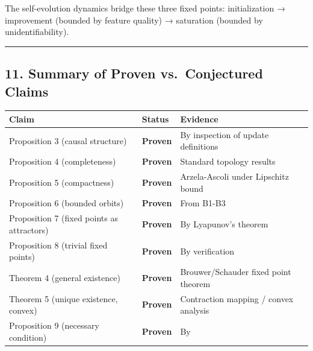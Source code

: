 \documentclass[
  12pt,
]{article}
\begin{document}
The self-evolution dynamics bridge these three fixed points:
initialization → improvement (bounded by feature quality) → saturation
(bounded by unidentifiability).

\begin{center}\rule{0.5\linewidth}{0.5pt}\end{center}

\subsection{11. Summary of Proven vs.~Conjectured
Claims}\label{summary-of-proven-vs.-conjectured-claims}

\begin{longtable}[]{@{}
  >{\raggedright\arraybackslash}p{}
  >{\raggedright\arraybackslash}p{}
  >{\raggedright\arraybackslash}p{}@{}}
\toprule\noalign{}
\begin{minipage}[b]{\linewidth}\raggedright
Claim
\end{minipage} & \begin{minipage}[b]{\linewidth}\raggedright
Status
\end{minipage} & \begin{minipage}[b]{\linewidth}\raggedright
Evidence
\end{minipage} \\
\midrule\noalign{}
\endhead
\bottomrule\noalign{}
\endlastfoot
Proposition 3 (causal structure) & \textbf{Proven} & By inspection of
update definitions \\
Proposition 4 (completeness) & \textbf{Proven} & Standard topology
results \\
Proposition 5 (compactness) & \textbf{Proven} & Arzela-Ascoli under
Lipschitz bound \\
Proposition 6 (bounded orbits) & \textbf{Proven} & From B1-B3 \\
Proposition 7 (fixed points as attractors) & \textbf{Proven} & By
Lyapunov's theorem \\
Proposition 8 (trivial fixed points) & \textbf{Proven} & By
verification \\
Theorem 4 (general existence) & \textbf{Proven} & Brouwer/Schauder fixed
point theorem \\
Theorem 5 (unique existence, convex) & \textbf{Proven} & Contraction
mapping / convex analysis \\
Proposition 9 (necessary condition) & \textbf{Proven} & By

\end{longtable}
\end{document}
